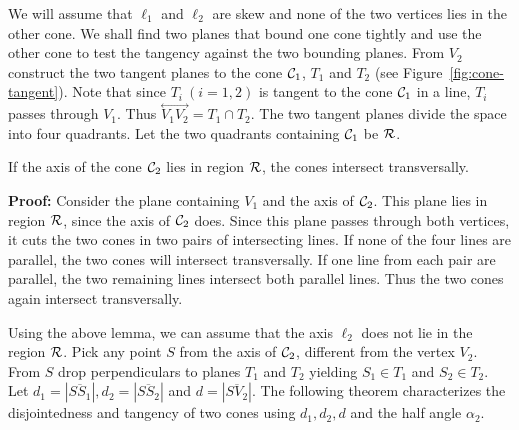     We will assume that $\ell_1$ and $\ell_2$ are skew and none of the two 
vertices lies in the other cone.  We shall find two planes that bound one cone
tightly and use the other cone to test the tangency against the two bounding 
planes.  From $V_2$ construct the two tangent planes to the cone 
${\cal C}_1$, $T_1$ and $T_2$ (see Figure~\ref{fig:cone-tangent}).  Note that 
since $T_i\ (i=1,2)$ is tangent to the cone ${\cal C}_1$ in a line, $T_i$ 
passes through $V_1$.  Thus $\stackrel{\longleftrightarrow}{V_1V_2}
=T_1\cap T_2$.  The two tangent planes divide the space into four quadrants.
Let the two quadrants containing ${\cal C}_1$ be ${\cal R}$.

\begin{lemma}
\label{lemma:cone-in-region}
     If the axis of the cone ${\cal C}_2$ lies in region ${\cal R}$, the cones
intersect transversally.
\end{lemma}
{\bf Proof:}  Consider the plane containing $V_1$ and the axis of ${\cal C}_2$.
This plane lies in region ${\cal R}$, since the axis of ${\cal C}_2$ does.
Since this plane passes through both vertices, it cuts the two cones
in two pairs of intersecting lines.  If none of the four lines are parallel,
the two cones will intersect transversally.  If one line from each pair are 
parallel, the two remaining lines intersect both parallel lines.  Thus the 
two cones again intersect transversally.\ \ \ \QED

     Using the above lemma, we can assume that the axis $\ell_2$ does not lie 
in the region ${\cal R}$.  Pick any point $S$ from the axis of ${\cal C}_2$, 
different from the vertex $V_2$.  From $S$ drop perpendiculars to planes $T_1$
and $T_2$ yielding $S_1\in T_1$ and $S_2\in T_2$.  Let $d_1=|\overline{SS_1}|,
d_2=|\overline{SS_2}|$ and $d=|\overline{SV_2}|$.  The following theorem 
characterizes the disjointedness and tangency of two cones using $d_1,d_2,d$ 
and the half angle $\alpha_2$.

